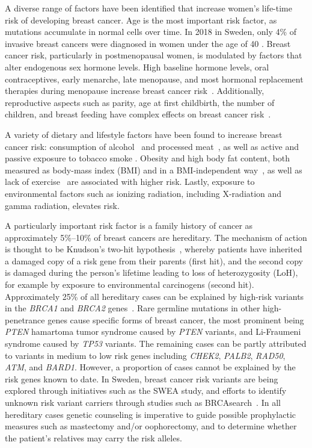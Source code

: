 \documentclass[11pt]{book}
\begin{document}
A diverse range of factors have been identified that increase women's life-time risk of developing breast cancer. Age is the most important risk factor, as mutations accumulate in normal cells over time. In 2018 in Sweden, only 4\% of invasive breast cancers were diagnosed in women under the age of 40 \cite{socialstyrelsen-db}. Breast cancer risk, particularly in postmenopausal women, is modulated by factors that alter endogenous sex hormone levels. High baseline hormone levels, oral contraceptives, early menarche, late menopause, and most hormonal replacement therapies during menopause increase breast cancer risk~\cite{Hamajima:2012, Morch:2017, CGHFBC:2019}. Additionally, reproductive aspects such as parity, age at first childbirth, the number of children, and breast feeding have complex effects on breast cancer risk~\cite{Ewertz:1990}.

A variety of dietary and lifestyle factors have been found to increase breast cancer risk: consumption of alcohol~\cite{Romineu:2015, Garaycoechea:2018} and processed meat~\cite{Inoue-Choi:2016, Anderson:2018}, as well as active and passive exposure to tobacco smoke \cite{Dossus:2014}. Obesity and high body fat content, both measured as body-mass index (BMI) and in a BMI-independent way~\cite{Pearson-Stuttard:2018, Iyengar:2018, Bjorge:2019}, as well as lack of exercise~\cite{Friedenreich:2010, Wu:2013} are associated with higher risk. Lastly, exposure to environmental factors such as ionizing radiation, including X-radiation and gamma radiation, elevates risk.

A particularly important risk factor is a family history of cancer as approximately 5\%--10\% of breast cancers are hereditary. The mechanism of action is thought to be Knudson's two-hit hypothesis~\cite{Knudson:1971}, whereby patients have inherited a damaged copy of a risk gene from their parents (first hit), and the second copy is damaged during the person's lifetime leading to loss of heterozygosity (LoH), for example by exposure to environmental carcinogens (second hit). Approximately 25\% of all hereditary cases can be explained by high-risk variants in the \textit{BRCA1} and \textit{BRCA2} genes~\cite{Nielsen:2016}. Rare germline mutations in other high-penetrance genes cause specific forms of breast cancer, the most prominent being 
\textit{PTEN} hamartoma tumor syndrome caused by \textit{PTEN} variants, and Li-Fraumeni syndrome caused by \textit{TP53} variants. The remaining cases can be partly attributed to variants in medium to low risk genes including \textit{CHEK2}, \textit{PALB2}, \textit{RAD50}, \textit{ATM}, and \textit{BARD1}. However, a proportion of cases cannot be explained by the risk genes known to date. In Sweden, breast cancer risk variants are being explored through initiatives such as the SWEA study, and efforts to identify unknown risk variant carriers through studies such as BRCAsearch~\cite{Nilsson:2018}. In all hereditary cases genetic counseling is imperative to guide possible prophylactic measures such as mastectomy and/or oophorectomy, and to determine whether the patient's relatives may carry the risk alleles.
\end{document}

